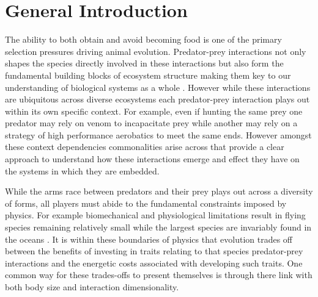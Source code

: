 \chapter{General Introduction}
\label{chap:introduction}%


\noindent
The ability to both obtain and avoid becoming food is one of the primary selection pressures driving animal evolution. Predator-prey interactions not only shapes the species directly involved in these interactions but also form the fundamental building blocks of ecosystem structure making them key to our understanding of biological systems as a whole \citep{pimm1984complexity,cohen1990community}. However while these interactions are ubiquitous across diverse ecosystems each predator-prey interaction plays out within its own specific context. For example, even if hunting the same prey one predator may rely on venom to incapacitate prey while another may rely on a strategy of high performance aerobatics to meet the same ends. However amongst these context dependencies commonalities arise across that provide a clear approach to understand how these interactions emerge and effect they have on the systems in which they are embedded.


While the arms race between predators and their prey plays out across a diversity of forms, all players must abide to the fundamental constraints imposed by physics. For example biomechanical and physiological limitations result in flying species remaining relatively small \citep{chatterjee2007aerodynamics,dudley2002mechanisms} while the largest species are invariably found in the oceans \citep{heim2015cope}. It is within these boundaries of physics that evolution trades off between the benefits of investing in traits relating to that species predator-prey interactions and the energetic costs associated with developing such traits. One common way for these trades-offs to present themselves is through there link with both body size and interaction dimensionality.


